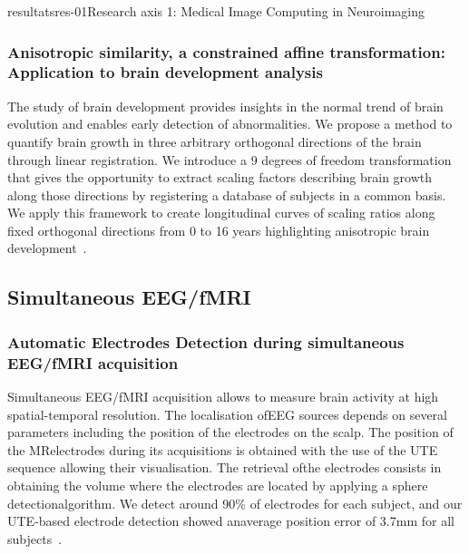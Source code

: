 \documentclass{ra2018}
\begin{document}
\begin{module}{resultats}{res-01}{Research axis 1: Medical Image Computing in Neuroimaging}
\subsubsection{Anisotropic similarity, a constrained affine transformation: Application to brain development analysis}
\begin{participants}
\end{participants}
The study of brain development provides insights in the normal trend of brain evolution and enables early detection of abnormalities. We propose a method to quantify brain growth in three arbitrary orthogonal directions of the brain through linear registration. We introduce a 9 degrees of freedom transformation that gives the opportunity to extract scaling factors describing brain growth along those directions by registering a database of subjects in a common basis. We apply this framework to create longitudinal curves of scaling ratios along fixed orthogonal directions from 0 to 16 years highlighting anisotropic brain development~\cite{legouhy:inserm-01871274}.


\subsection{Simultaneous EEG/fMRI}
\subsubsection{Automatic Electrodes Detection during simultaneous EEG/fMRI acquisition}
\begin{participants}
\end{participants}
Simultaneous EEG/fMRI acquisition allows to measure brain activity at high spatial-temporal resolution. The localisation ofEEG sources depends on several parameters including the position of the electrodes on the scalp. The position of the MRelectrodes during its acquisitions is obtained with the use of the UTE sequence allowing their visualisation. The retrieval ofthe electrodes consists in obtaining the volume where the electrodes are located by applying a sphere detectionalgorithm. We detect around 90\% of electrodes for each subject, and our UTE-based electrode detection showed anaverage position error of 3.7mm for all subjects~\cite{fleury:hal-01874815}.


\end{module}
\end{document}

